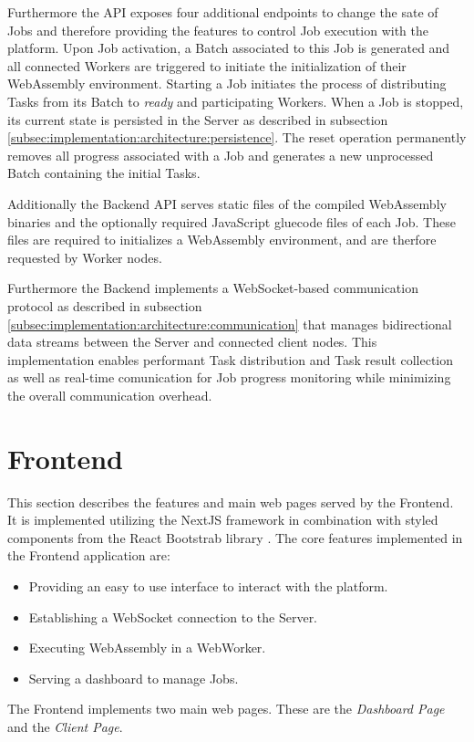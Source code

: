 Furthermore the \ac{API} exposes four additional endpoints to change the sate of Jobs and therefore providing the features to control Job execution with the platform. Upon Job activation, a Batch associated to this Job is generated and all connected Workers are triggered to initiate the initialization of their WebAssembly environment. Starting a Job initiates the process of distributing Tasks from its Batch to \emph{ready} and participating Workers. When a Job is stopped, its current state is persisted in the Server as described in subsection \ref{subsec:implementation:architecture:persistence}. The reset operation permanently removes all progress associated with a Job and generates a new unprocessed Batch containing the initial Tasks.

Additionally the Backend \ac{API} serves static files of the compiled WebAssembly binaries and the optionally required JavaScript gluecode files of each Job. These files are required to initializes a WebAssembly environment, and are therfore requested by Worker nodes.

Furthermore the Backend implements a WebSocket-based communication protocol as described in subsection \ref{subsec:implementation:architecture:communication} that manages bidirectional data streams between the Server and connected client nodes. This implementation enables performant Task distribution and Task result collection as well as real-time comunication for Job progress monitoring while minimizing the overall communication overhead.

\section{Frontend}
\label{sec:implementation:frontend}
This section describes the features and main web pages served by the Frontend. It is implemented utilizing the NextJS framework in combination with styled components from the React Bootstrab library \cite{implementation:bootstrap}. The core features implemented in the Frontend application are:
\begin{itemize}
    \item Providing an easy to use interface to interact with the platform.
    \item Establishing a WebSocket connection to the Server.
    \item Executing WebAssembly in a WebWorker.
    \item Serving a dashboard to manage Jobs.
\end{itemize}
The Frontend implements two main web pages. These are the \emph{Dashboard Page} and the \emph{Client Page}.

